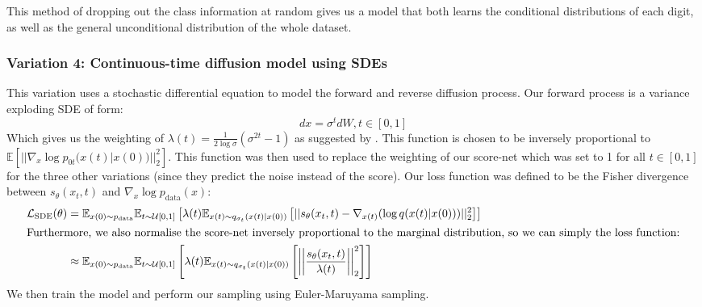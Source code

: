 This method of dropping out the class information at random gives us a model
that both learns the conditional distributions of each digit, as well as the
general unconditional distribution of the whole dataset.


\subsubsection{Variation 4: Continuous-time diffusion model using SDEs}
This variation uses a stochastic differential equation to model the forward and reverse diffusion process. 
Our forward process is a variance exploding SDE of form:
\begin{equation}
  dx = \sigma ^ t dW, t \in [0, 1]
\end{equation}
Which gives us the weighting of
$\lambda(t) = \frac{1}{2 \log \sigma} (\sigma^{2t}-1)$ as suggested by \cite{yang_song}.
This function is chosen to be inversely proportional to $\mathbb{E}[||\nabla_x \log p_{0t}(x(t) | x(0))||^2_2]$.
This function was then used to replace the weighting of our score-net
which was set to 1 for all $t \in [0, 1]$ for the three other variations (since they predict the noise instead of the score).
Our loss function was defined to be the Fisher divergence between $s_\theta(x_t, t)$ and $\nabla_x \log p_{\text{data}}(x)$:
\begin{align}
  \mathcal{L}_\text{SDE}(\theta) &= \mathbb{E}_{x(0) \sim p_\text{data}} \mathbb{E}_{t \sim \mathcal{U}[0, 1]} \left[ 
  \lambda(t) \mathbb{E}_{x(t) \sim q_{\sigma_t}(x(t) | x(0))} \left[
    ||s_\theta (x_t, t) - \nabla_{x(t)} (\log q(x(t) | x(0)))||^2_2
    \right]\right]\\
  \intertext{Furthermore, we also normalise the score-net
  inversely proportional to the marginal distribution, so we can simply the loss function:}
    &\approx \mathbb{E}_{x(0) \sim p_\text{data}} \mathbb{E}_{t \sim \mathcal{U}[0, 1]} \left[ 
  \lambda(t) \mathbb{E}_{x(t) \sim q_{\sigma_t}(x(t) | x(0))} \left[
    \left|\left|\frac{s_\theta(x_t, t)}{\lambda(t)}\right|\right|^2_2
    \right]\right]
\end{align}
We then train the model and perform our sampling using Euler-Maruyama sampling.


